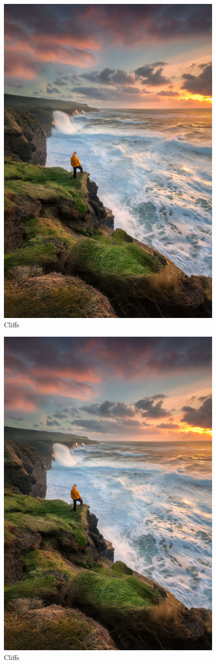 \documentclass[../main.tex]{subfiles}
\begin{document}

\begin{figure}
  \includegraphics[width=\linewidth]{images/picture.jpg}
  \caption{Cliffs} %
\end{figure}

\blindtext

\begin{figure}[h]
  \centering
  \includegraphics[width=0.25\linewidth]{images/picture.jpg}
  \caption{Cliffs} %
\end{figure}

\blindtext
\end{document}

